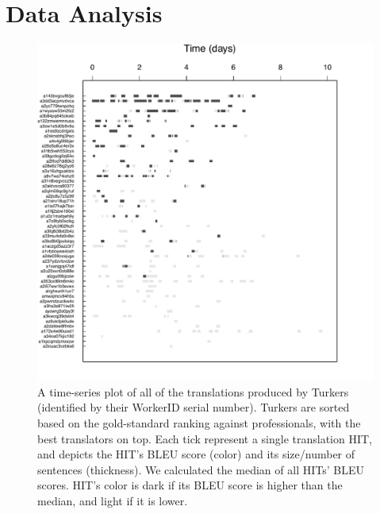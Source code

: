 \documentclass[11pt]{article}
\begin{document}
\section{Data Analysis} \label{dataanaly}

\begin{figure}[h!]
  \centering
  \includegraphics[width=\linewidth]{WorkerPerf/wp.pdf}
  \caption{A time-series plot of all of the translations produced by Turkers (identified by their WorkerID serial number). Turkers are sorted based on the gold-standard ranking against professionals, with the best translators on top. Each tick represent a single translation HIT, and depicts the HIT's BLEU score (color) and its size/number of sentences (thickness).  
  We calculated the median of all HITs' BLEU scores.   HIT's color is dark if its BLEU score is higher than the median, and light if it is lower. 
  }
    \label{fworkerperf}
\end{figure}
\end{document}

